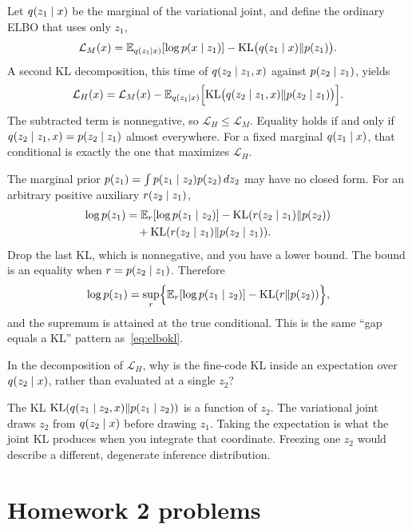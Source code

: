 Let $q(z_1\mid x)$ be the marginal of the variational joint, and define the ordinary ELBO that uses only $z_1$,
\[
\mathcal L_M(x)
=\mathbb{E}_{q(z_1\mid x)}[\log p(x\mid z_1)]
-\mathrm{KL}\bigl(q(z_1\mid x)\Vert p(z_1)\bigr).
\]
A second KL decomposition, this time of $q(z_2\mid z_1,x)$ against $p(z_2\mid z_1)$, yields
\[
\mathcal L_H(x)
=\mathcal L_M(x)
-\mathbb{E}_{q(z_1\mid x)}\Bigl[\mathrm{KL}\bigl(q(z_2\mid z_1,x)\Vert p(z_2\mid z_1)\bigr)\Bigr].
\]
The subtracted term is nonnegative, so $\mathcal L_H\le\mathcal L_M$. Equality holds if and only if $q(z_2\mid z_1,x)=p(z_2\mid z_1)$ almost everywhere. For a fixed marginal $q(z_1\mid x)$, that conditional is exactly the one that maximizes $\mathcal L_H$.

The marginal prior $p(z_1)=\int p(z_1\mid z_2)p(z_2)\,dz_2$ may have no closed form. For an arbitrary positive auxiliary $r(z_2\mid z_1)$,
\begin{align*}
\log p(z_1)
&=\mathbb{E}_{r}[\log p(z_1\mid z_2)]-\mathrm{KL}(r(z_2\mid z_1)\Vert p(z_2))\\
&\quad+\mathrm{KL}(r(z_2\mid z_1)\Vert p(z_2\mid z_1)).
\end{align*}
Drop the last KL, which is nonnegative, and you have a lower bound. The bound is an equality when $r=p(z_2\mid z_1)$. Therefore
\[
\log p(z_1)
=\sup_r\Bigl\{\mathbb{E}_r[\log p(z_1\mid z_2)]-\mathrm{KL}(r\Vert p(z_2))\Bigr\},
\]
and the supremum is attained at the true conditional. This is the same ``gap equals a KL'' pattern as~\eqref{eq:elbokl}.

\begin{practbox}
In the decomposition of $\mathcal L_H$, why is the fine-code KL inside an expectation over $q(z_2\mid x)$, rather than evaluated at a single $z_2$?
\end{practbox}
\begin{solbox}
The KL $\mathrm{KL}(q(z_1\mid z_2,x)\Vert p(z_1\mid z_2))$ is a function of $z_2$. The variational joint draws $z_2$ from $q(z_2\mid x)$ before drawing $z_1$. Taking the expectation is what the joint KL produces when you integrate that coordinate. Freezing one $z_2$ would describe a different, degenerate inference distribution.
\end{solbox}

\section{Homework 2 problems}

